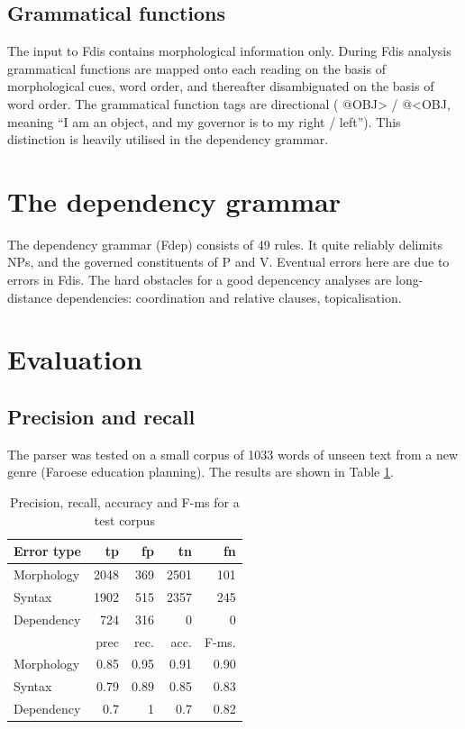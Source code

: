 \documentclass[11pt]{article}
\begin{document}
\subsection{Grammatical functions}

The input to Fdis contains morphological information only. During Fdis analysis grammatical functions are mapped onto each reading on the basis of morphological cues, word order, and thereafter disambiguated on the basis of word order. The grammatical function tags are directional ( @OBJ> / @<OBJ, meaning “I am an object, and my governor is to my right / left”). This distinction is heavily utilised in the dependency grammar.

\section{The dependency grammar}

The dependency grammar (Fdep) consists of 49 rules. It quite reliably delimits NPs, and the governed constituents of P and V.  Eventual errors here are due to errors in Fdis.  The hard obstacles for a good depencency analyses are long-distance dependencies:  coordination and relative clauses, topicalisation.

\section{Evaluation}
\subsection{Precision and recall}

The parser was tested on a small corpus of 1033 words of unseen text from a new genre (Faroese education planning). The results are shown in Table \ref{prec}.


\begin{table}[htbp]
\caption{Precision, recall, accuracy and F-ms for a test corpus}
\begin{center}
\begin{tabular}{|l|r|r|r|r|}
\hline
Error type	& tp		& fp		& tn		& fn	\\
\hline
Morphology  &  2048  &  369  &  2501  &  101 \\ 
Syntax  &  1902  &  515  &  2357  &  245 \\  
Dependency &  724  &  316  &  0  &  0 \\
\hline
\hline
 & prec	 & rec.	& acc.	& F-ms. \\
\hline
Morphology    &  0.85  &  0.95  &  0.91  &  0.90 \\
Syntax    &  0.79  &  0.89  &  0.85  &  0.83 \\
Dependency  &  0.7  &  1  &  0.7  &  0.82 \\
\hline
\end{tabular}
\end{center}
\label{prec}
\end{table}%
\end{document}
